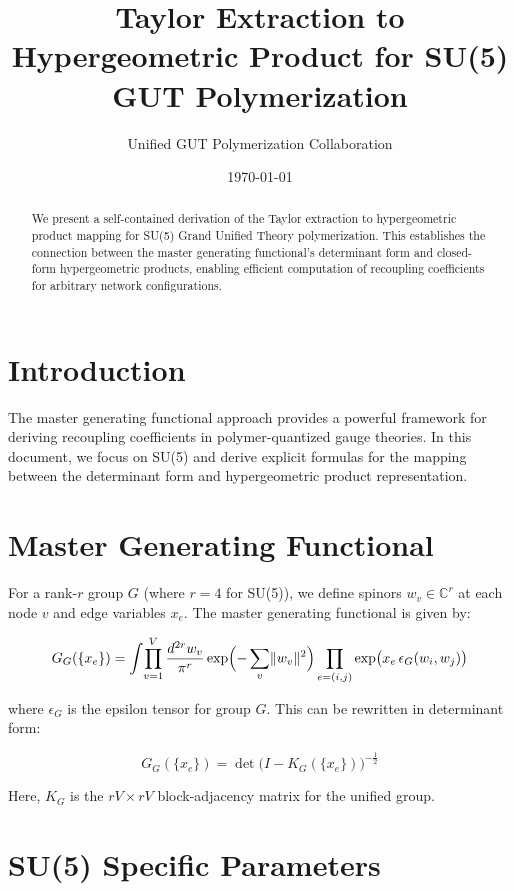 \documentclass[11pt]{article}
\title{Taylor Extraction to Hypergeometric Product for SU(5) GUT Polymerization}
\author{Unified GUT Polymerization Collaboration}
\date{\today}
\begin{document}
\maketitle

\begin{abstract}
    We present a self-contained derivation of the Taylor extraction to hypergeometric product mapping for SU(5) Grand Unified Theory polymerization. This establishes the connection between the master generating functional's determinant form and closed-form hypergeometric products, enabling efficient computation of recoupling coefficients for arbitrary network configurations.
\end{abstract}

\section{Introduction}
The master generating functional approach provides a powerful framework for deriving recoupling coefficients in polymer-quantized gauge theories. In this document, we focus on SU(5) and derive explicit formulas for the mapping between the determinant form and hypergeometric product representation.

\section{Master Generating Functional}

For a rank-$r$ group $G$ (where $r=4$ for SU(5)), we define spinors $w_v\in\mathbb{C}^r$ at each node $v$ and edge variables $x_e$. The master generating functional is given by:

\begin{equation}
 G_G(\{x_e\}) = \int\!\prod_{v=1}^V\frac{d^{2r}w_v}{\pi^r} \exp\Bigl(-\sum_v\lVert w_v\rVert^2\Bigr) \prod_{e=(i,j)}\exp\bigl(x_e\,\epsilon_G(w_i,w_j)\bigr)
\end{equation}

where $\epsilon_G$ is the epsilon tensor for group $G$. This can be rewritten in determinant form:

\begin{equation}
 G_G(\{x_e\}) = \det\!\bigl(I - K_G(\{x_e\})\bigr)^{-\tfrac12}
\end{equation}

Here, $K_G$ is the $rV\times rV$ block-adjacency matrix for the unified group.

\section{SU(5) Specific Parameters}
\end{document}
